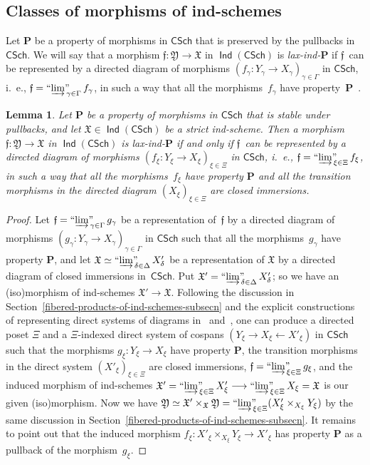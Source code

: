 \documentclass[12pt,a4paper]{amsart}
\newcommand{\+}{\protect\nobreakdash-}
\renewcommand{\:}{\colon}
\newcommand{\rarrow}{\longrightarrow}
\DeclareMathOperator{\Ind}{\mathsf{Ind}}
\newcommand{\CSch}{\mathsf{CSch}}
\newcommand{\ilim}
 {\mathop{\text{\normalfont``$\varinjlim$''\!\!}}\nolimits}
\newcommand{\bP}{\mathbf P}
\newcommand{\fX}{\mathfrak X}
\newcommand{\fY}{\mathfrak Y}
\newcommand{\ff}{\mathfrak f}
\theoremstyle{plain}
\newtheorem{lem}[thm]{Lemma}
\theoremstyle{definition}
\begin{document}
\subsection{Classes of morphisms of ind-schemes}
\label{classes-of-morphisms-of-ind-schemes-subsecn}
 Let $\bP$ be a property of morphisms in $\CSch$ that is preserved by
the pullbacks in~$\CSch$.
 We will say that a morphism $\ff\:\fY\rarrow\fX$ in $\Ind(\CSch)$ is
\emph{lax-ind\+$\bP$} if $\ff$~can be represented by a directed diagram of morphisms $(f_\gamma\:Y_\gamma\to X_\gamma)_{\gamma\in\Gamma}$
in $\CSch$, i.~e., $\ff=\ilim_{\gamma\in\Gamma}f_\gamma$, in such
a way that all the morphisms~$f_\gamma$ have property~$\bP$
\,\cite[Definition~1.19]{Rich}.

\begin{lem} \label{morphisms-with-property-lax-ind-P-and-strictness}
 Let\/ $\bP$ be a property of morphisms in\/ $\CSch$ that is
stable under pullbacks, and let\/ $\fX\in\Ind(\CSch)$ be a strict
ind-scheme.
 Then a morphism\/ $\ff\:\fY\rarrow\fX$ in\/ $\Ind(\CSch)$ is
lax-ind\+$\bP$ if and only if\/ $\ff$~can be represented by a directed
diagram of morphisms $(f_\xi\:Y_\xi\to X_\xi)_{\xi\in\Xi}$ in $\CSch$,
i.~e., $\ff=\ilim_{\xi\in\Xi}f_\xi$, in such a way that all
the morphisms~$f_\xi$ have property\/ $\bP$ \emph{and} all
the transition morphisms in the directed diagram $(X_\xi)_{\xi\in\Xi}$
are closed immersions.
\end{lem}

\begin{proof}
 Let $\ff=\ilim_{\gamma\in\Gamma} g_\gamma$ be a representation
of~$\ff$ by a directed diagram of morphisms
$(g_\gamma\:Y_\gamma\to X_\gamma)_{\gamma\in\Gamma}$ in $\CSch$ such
that all the morphisms~$g_\gamma$ have property $\bP$, and let
$\fX\simeq\ilim_{\delta\in\Delta}X'_\delta$ be a representation of $\fX$
by a directed diagram of closed immersions in~$\CSch$.
 Put $\fX'=\ilim_{\delta\in\Delta}X'_\delta$; so we have
an (iso)morphism of ind-schemes $\fX'\rarrow\fX$.
 Following the discussion in
Section~\ref{fibered-products-of-ind-schemes-subsecn} and
the explicit constructions of representing direct systems of diagrams
in~\cite[Section~9]{Pextop} and~\cite[Section~1.1]{Psemten}, one
can produce a directed poset $\Xi$ and a $\Xi$\+indexed direct system
of cospans $(Y_\xi\rightarrow X_\xi\leftarrow X'_\xi)$ in $\CSch$
such that the morphisms $g_\xi\:Y_\xi\rarrow X_\xi$ have property $\bP$,
the transition morphisms in the direct system $(X'_\xi)_{\xi\in\Xi}$
are closed immersions, $\ff=\ilim_{\xi\in\Xi}g_\xi$, and the induced
morphism of ind-schemes $\fX'=\ilim_{\xi\in\Xi}X'_\xi\rarrow
\ilim_{\xi\in\Xi}X_\xi=\fX$ is our given (iso)morphism.
 Now we have $\fY\simeq\fX'\times_\fX\fY=\ilim_{\xi\in\Xi}
(X'_\xi\times_{X_\xi}\nobreak Y_\xi)$ by the same discussion
in Section~\ref{fibered-products-of-ind-schemes-subsecn}.
 It remains to point out that the induced morphism
$f_\xi\:X'_\xi\times_{X_\xi}Y_\xi\rarrow X'_\xi$ has property $\bP$
as a pullback of the morphism~$g_\xi$.
\end{proof}
\end{document}
